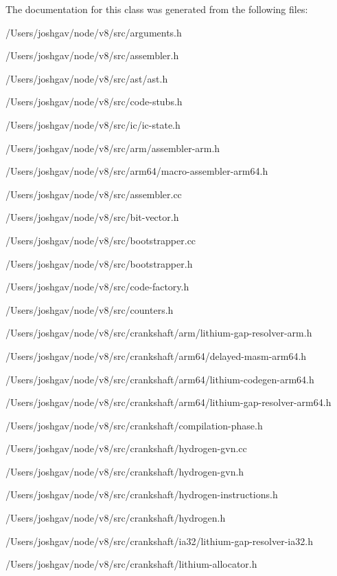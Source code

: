 The documentation for this class was generated from the following files\+:\begin{DoxyCompactItemize}
\item 
/\+Users/joshgav/node/v8/src/arguments.\+h\item 
/\+Users/joshgav/node/v8/src/assembler.\+h\item 
/\+Users/joshgav/node/v8/src/ast/ast.\+h\item 
/\+Users/joshgav/node/v8/src/code-\/stubs.\+h\item 
/\+Users/joshgav/node/v8/src/ic/ic-\/state.\+h\item 
/\+Users/joshgav/node/v8/src/arm/assembler-\/arm.\+h\item 
/\+Users/joshgav/node/v8/src/arm64/macro-\/assembler-\/arm64.\+h\item 
/\+Users/joshgav/node/v8/src/assembler.\+cc\item 
/\+Users/joshgav/node/v8/src/bit-\/vector.\+h\item 
/\+Users/joshgav/node/v8/src/bootstrapper.\+cc\item 
/\+Users/joshgav/node/v8/src/bootstrapper.\+h\item 
/\+Users/joshgav/node/v8/src/code-\/factory.\+h\item 
/\+Users/joshgav/node/v8/src/counters.\+h\item 
/\+Users/joshgav/node/v8/src/crankshaft/arm/lithium-\/gap-\/resolver-\/arm.\+h\item 
/\+Users/joshgav/node/v8/src/crankshaft/arm64/delayed-\/masm-\/arm64.\+h\item 
/\+Users/joshgav/node/v8/src/crankshaft/arm64/lithium-\/codegen-\/arm64.\+h\item 
/\+Users/joshgav/node/v8/src/crankshaft/arm64/lithium-\/gap-\/resolver-\/arm64.\+h\item 
/\+Users/joshgav/node/v8/src/crankshaft/compilation-\/phase.\+h\item 
/\+Users/joshgav/node/v8/src/crankshaft/hydrogen-\/gvn.\+cc\item 
/\+Users/joshgav/node/v8/src/crankshaft/hydrogen-\/gvn.\+h\item 
/\+Users/joshgav/node/v8/src/crankshaft/hydrogen-\/instructions.\+h\item 
/\+Users/joshgav/node/v8/src/crankshaft/hydrogen.\+h\item 
/\+Users/joshgav/node/v8/src/crankshaft/ia32/lithium-\/gap-\/resolver-\/ia32.\+h\item 
/\+Users/joshgav/node/v8/src/crankshaft/lithium-\/allocator.\+h\item 

\end{DoxyCompactItemize}
